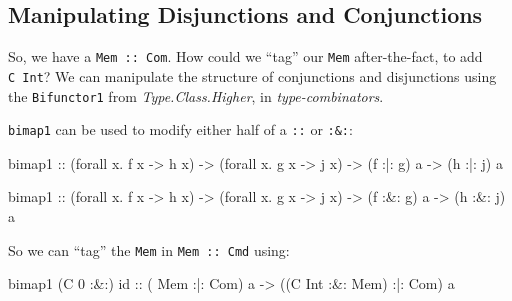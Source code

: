 \documentclass[]{article}
\newenvironment{Shaded}{}{}
\newcommand{\DataTypeTok}[1]{\textcolor[rgb]{0.56,0.13,0.00}{#1}}
\newcommand{\DecValTok}[1]{\textcolor[rgb]{0.25,0.63,0.44}{#1}}
\newcommand{\FunctionTok}[1]{\textcolor[rgb]{0.02,0.16,0.49}{#1}}
\newcommand{\NormalTok}[1]{#1}
\newcommand{\OtherTok}[1]{\textcolor[rgb]{0.00,0.44,0.13}{#1}}
\begin{document}
\hypertarget{manipulating-disjunctions-and-conjunctions}{%
\subsection{Manipulating Disjunctions and
Conjunctions}\label{manipulating-disjunctions-and-conjunctions}}

So, we have a \texttt{Mem\ :\textbar{}:\ Com}. How could we ``tag'' our
\texttt{Mem} after-the-fact, to add \texttt{C\ Int}? We can manipulate the
structure of conjunctions and disjunctions using the \texttt{Bifunctor1} from
\emph{Type.Class.Higher}, in \emph{type-combinators}.

\texttt{bimap1} can be used to modify either half of a \texttt{:\textbar{}:} or
\texttt{:\&:}:

\begin{Shaded}
\begin{Highlighting}[]
\NormalTok{bimap1}
\OtherTok{    ::}\NormalTok{ (forall x}\FunctionTok{.}\NormalTok{ f x }\OtherTok{->}\NormalTok{ h x)}
    \OtherTok{->}\NormalTok{ (forall x}\FunctionTok{.}\NormalTok{ g x }\OtherTok{->}\NormalTok{ j x)}
    \OtherTok{->}\NormalTok{ (f }\FunctionTok{:|:}\NormalTok{ g) a}
    \OtherTok{->}\NormalTok{ (h }\FunctionTok{:|:}\NormalTok{ j) a}

\NormalTok{bimap1}
\OtherTok{    ::}\NormalTok{ (forall x}\FunctionTok{.}\NormalTok{ f x }\OtherTok{->}\NormalTok{ h x)}
    \OtherTok{->}\NormalTok{ (forall x}\FunctionTok{.}\NormalTok{ g x }\OtherTok{->}\NormalTok{ j x)}
    \OtherTok{->}\NormalTok{ (f }\FunctionTok{:&:}\NormalTok{ g) a}
    \OtherTok{->}\NormalTok{ (h }\FunctionTok{:&:}\NormalTok{ j) a}
\end{Highlighting}
\end{Shaded}

So we can ``tag'' the \texttt{Mem} in \texttt{Mem\ :\textbar{}:\ Cmd} using:

\begin{Shaded}
\begin{Highlighting}[]
\NormalTok{bimap1 (}\DataTypeTok{C} \DecValTok{0} \FunctionTok{:&:}\NormalTok{) id}
\OtherTok{    ::}\NormalTok{ (      }\DataTypeTok{Mem}       \FunctionTok{:|:} \DataTypeTok{Com}\NormalTok{) a}
    \OtherTok{->}\NormalTok{ ((}\DataTypeTok{C} \DataTypeTok{Int} \FunctionTok{:&:} \DataTypeTok{Mem}\NormalTok{) }\FunctionTok{:|:} \DataTypeTok{Com}\NormalTok{) a}
\end{Highlighting}
\end{Shaded}
\end{document}
